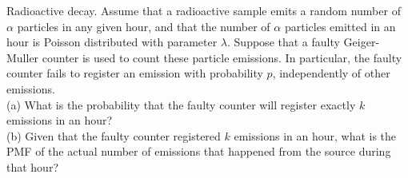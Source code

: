 \begin{exercise}
    Radioactive decay. Assume that a radioactive sample emits a random number of \(\alpha\) particles in any given hour, and that the number of \(\alpha\) particles emitted in an hour is Poisson distributed with parameter \(\lambda\). Suppose that a faulty Geiger-Muller counter is used to count these particle emissions. In particular, the faulty counter fails to register an emission with probability \(p\), independently of other emissions. \\

    (a) What is the probability that the faulty counter will register exactly \(k\) emissions in an hour? \\
    (b) Given that the faulty counter registered \(k\) emissions in an hour, what is the PMF of the actual number of emissions that happened from the source during that hour?
    \end{exercise}
    
